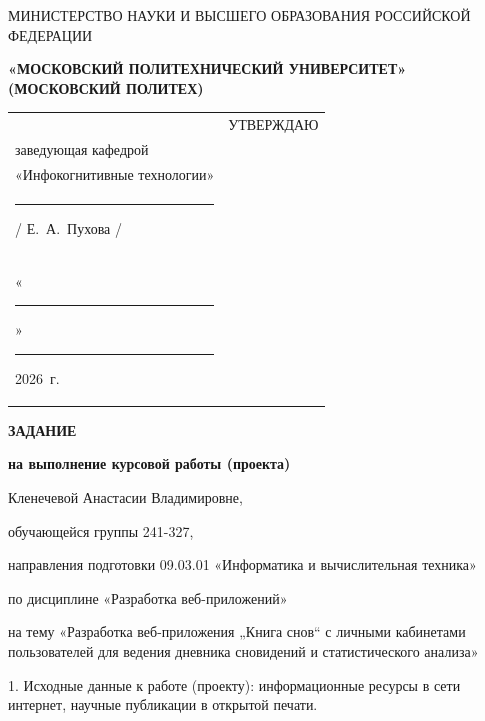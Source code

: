 \documentclass[14pt, a4paper]{extarticle}
\begin{document}
\pagestyle{empty}


\begin{center}
    {\small МИНИСТЕРСТВО НАУКИ И ВЫСШЕГО ОБРАЗОВАНИЯ РОССИЙСКОЙ ФЕДЕРАЦИИ}


    {\small \textbf{«МОСКОВСКИЙ ПОЛИТЕХНИЧЕСКИЙ УНИВЕРСИТЕТ»}} \\
    {\small \textbf{(МОСКОВСКИЙ ПОЛИТЕХ)}}
\end{center}

\begin{tabularx}{\textwidth}{@{} p{} p{} @{}}
     &
    \raggedright
    УТВЕРЖДАЮ                          \\
    заведующая кафедрой                \\
    «Инфокогнитивные технологии»       \\[0.3cm]

    \rule{3cm}{0.4pt} / Е.~А.~Пухова / \\[0.1cm]

    «\rule{0.8cm}{0.4pt}» \rule{3cm}{0.4pt} 2026~г.
\end{tabularx}


\begin{center}

    { \large \textbf{ЗАДАНИЕ}}

    \textbf{на выполнение курсовой работы (проекта)}

    Кленечевой Анастасии Владимировне, %

\end{center}

обучающейся группы 241-327,

направления подготовки 09.03.01 «Информатика и вычислительная техника»

по дисциплине «Разработка веб-приложений»

на тему «Разработка веб-приложения „Книга снов“ с личными кабинетами пользователей для ведения дневника сновидений и статистического анализа»

1. Исходные данные к работе (проекту): информационные ресурсы в сети
интернет, научные публикации в открытой печати.
\end{document}
